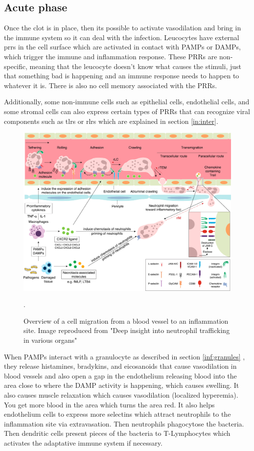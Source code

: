 \subsection{Acute phase}

Once the clot is in place, then its possible to activate vasodilation and bring in the immune system so it can deal with the infection. Leucocytes have external \gls{prrs} in the cell surface which are activated in contact with PAMPs or DAMPs, which trigger the immune and inflammation response. These PRRs are non-specific, meaning that the leucocyte doesn't know what causes the stimuli, just that something bad is happening and an immune response needs to happen to whatever it is. There is also no cell memory associated with the PRRs.

Additionally, some non-immune cells such as epithelial cells, endothelial cells, and some stromal cells can also express certain types of PRRs that can recognize viral components such as \gls{tlrs} or \gls{rlrs} which are explained in section \ref{in:inter}.

    \begin{figure}[h!]
        \centering
            \includegraphics[width=0.8\linewidth]{figures/Inflammation/jlb0617-fig-0002-m.jpg} 
        \caption{Overview of a cell migration from a blood vessel to an inflammation site. Image reproduced from "Deep insight into neutrophil trafficking in various organs" \cite{Hyun2017}}.
        \label{figure:inflammationStarts}
    \end{figure}  

When PAMPs interact with a granulocyte as described in section \ref{inf:granules} , they release histamines, bradykins, and eicosanoids that cause vasodilation in blood vessels and also open a gap in the endothelium releasing blood into the area close to where the DAMP activity is happening, which causes swelling. It also causes muscle relaxation which causes vasodilation (localized hyperemia). You get more blood in the area which turns the area red. It also helps endothelium cells to express more selectins which attract neutrophils to the inflammation site via extravasation. Then neutrophils phagocytose the bacteria. Then dendritic cells present pieces of the bacteria to T-Lymphocytes which activates the adaptative immune system if necessary. 

